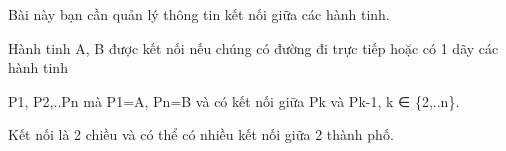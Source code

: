 Bài này bạn cần quản lý thông tin kết nối giữa các hành tinh.

Hành tinh A, B được kết nối nếu chúng có đường đi trực tiếp hoặc có 1 dãy các hành tinh

P1, P2,..Pn mà P1=A, Pn=B và có kết nối giữa Pk và Pk-1, k ∈ \{2,..n\}.

Kết nối là 2 chiều và có thể có nhiều kết nối giữa 2 thành phố.

\